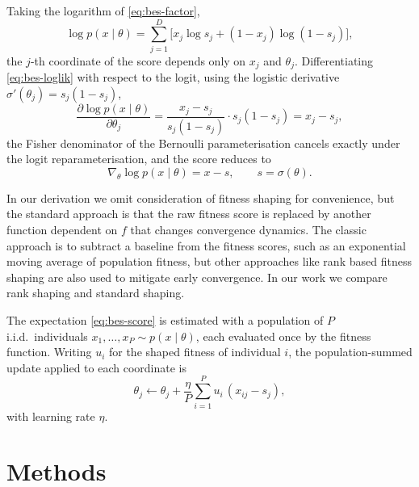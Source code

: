 \documentclass[runningheads]{llncs}
\begin{document}
Taking the
logarithm of \eqref{eq:bes-factor},
\begin{equation}
\log p(x \mid \theta) = \sum_{j=1}^{D}
  \bigl[x_j \log s_j + (1 - x_j) \log (1 - s_j)\bigr],
\label{eq:bes-loglik}
\end{equation}
the $j$-th coordinate of the score depends only on $x_j$ and $\theta_j$.
Differentiating \eqref{eq:bes-loglik} with respect to the logit, using
the logistic derivative $\sigma'(\theta_j) = s_j(1-s_j)$,
\begin{equation}
\frac{\partial \log p(x \mid \theta)}{\partial \theta_j}
  = \frac{x_j - s_j}{s_j(1-s_j)} \cdot s_j(1-s_j)
  = x_j - s_j,
\label{eq:bes-score-bit}
\end{equation}
the Fisher denominator of the Bernoulli parameterisation cancels exactly
under the logit reparameterisation, and the score reduces to
\begin{equation}
\nabla_\theta \log p(x \mid \theta) = x - s,
\qquad s = \sigma(\theta).
\label{eq:bes-score-vec}
\end{equation}

In our derivation we omit consideration of fitness shaping for convenience, but the standard approach is that the raw fitness score is replaced by another function dependent on $f$ that changes convergence dynamics. The classic approach is to subtract a baseline from the fitness scores, such as an exponential moving average of population fitness, but other approaches like rank based fitness shaping are also used to mitigate early convergence. In our work we compare rank shaping and standard shaping.

The expectation \eqref{eq:bes-score} is estimated with a population of
$P$ i.i.d.\ individuals $x_1, \dots, x_P \sim p(x \mid \theta)$, each
evaluated once by the fitness function. Writing $u_i$ for the shaped fitness of individual $i$,
the population-summed update applied to each coordinate is
\begin{equation}
\theta_j \leftarrow \theta_j + \frac{\eta}{P} \sum_{i=1}^{P} u_i\,(x_{ij} - s_j),
\label{eq:bes-update}
\end{equation}
with learning rate $\eta$.

\section{Methods}
\label{sec:methods}
\end{document}
